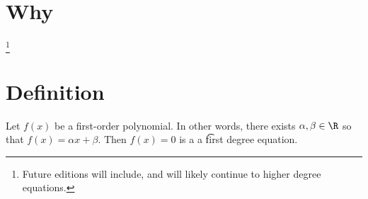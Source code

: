 

\section*{Why}
\footnote{Future editions will include, and will likely continue to higher degree equations.}
\section*{Definition}

Let $f(x)$ be a first-order polynomial.
In other words, there exists $\alpha , \beta  \in \R $ so that $f(x) = \alpha  x + \beta $.
Then $f(x) = 0$ is a a \t{first degree equation}.

\blankpage